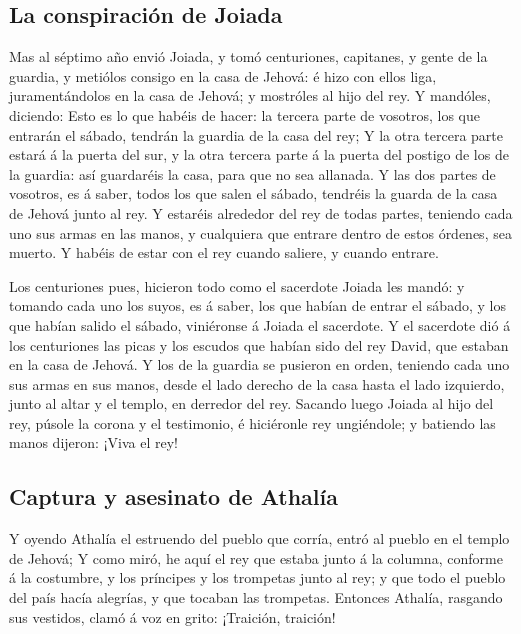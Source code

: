 \hypertarget{la-conspiraciuxf3n-de-joiada}{%
\subsection{La conspiración de
Joiada}\label{la-conspiraciuxf3n-de-joiada}}

 Mas al séptimo año envió Joiada, y tomó centuriones,
capitanes, y gente de la guardia, y metiólos consigo en la casa de
Jehová: é hizo con ellos liga, juramentándolos en la casa de Jehová; y
mostróles al hijo del rey.  Y mandóles, diciendo: Esto es
lo que habéis de hacer: la tercera parte de vosotros, los que entrarán
el sábado, tendrán la guardia de la casa del rey;  Y la
otra tercera parte estará á la puerta del sur, y la otra tercera parte á
la puerta del postigo de los de la guardia: así guardaréis la casa, para
que no sea allanada.  Y las dos partes de vosotros, es á
saber, todos los que salen el sábado, tendréis la guarda de la casa de
Jehová junto al rey.  Y estaréis alrededor del rey de
todas partes, teniendo cada uno sus armas en las manos, y cualquiera que
entrare dentro de estos órdenes, sea muerto. Y habéis de estar con el
rey cuando saliere, y cuando entrare.

 Los centuriones pues, hicieron todo como el sacerdote
Joiada les mandó: y tomando cada uno los suyos, es á saber, los que
habían de entrar el sábado, y los que habían salido el sábado,
viniéronse á Joiada el sacerdote.  Y el sacerdote dió á
los centuriones las picas y los escudos que habían sido del rey David,
que estaban en la casa de Jehová.  Y los de la guardia se
pusieron en orden, teniendo cada uno sus armas en sus manos, desde el
lado derecho de la casa hasta el lado izquierdo, junto al altar y el
templo, en derredor del rey.  Sacando luego Joiada al
hijo del rey, púsole la corona y el testimonio, é hiciéronle rey
ungiéndole; y batiendo las manos dijeron: ¡Viva el rey!

\hypertarget{captura-y-asesinato-de-athaluxeda}{%
\subsection{Captura y asesinato de
Athalía}\label{captura-y-asesinato-de-athaluxeda}}

 Y oyendo Athalía el estruendo del pueblo que corría,
entró al pueblo en el templo de Jehová;  Y como miró, he
aquí el rey que estaba junto á la columna, conforme á la costumbre, y
los príncipes y los trompetas junto al rey; y que todo el pueblo del
país hacía alegrías, y que tocaban las trompetas. Entonces Athalía,
rasgando sus vestidos, clamó á voz en grito: ¡Traición, traición!


